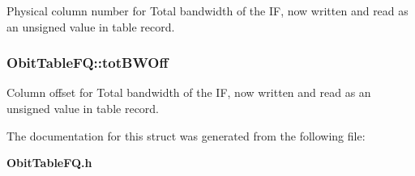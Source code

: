 Physical column number for Total bandwidth of the IF, now written and read as an unsigned value in table record. 

\subsubsection{ {\bf Obit\-Table\-FQ::tot\-BWOff}}\label{structObitTableFQ_o22}


Column offset for Total bandwidth of the IF, now written and read as an unsigned value in table record. 



The documentation for this struct was generated from the following file:\begin{CompactItemize}
\item 
{\bf Obit\-Table\-FQ.h}\end{CompactItemize}
